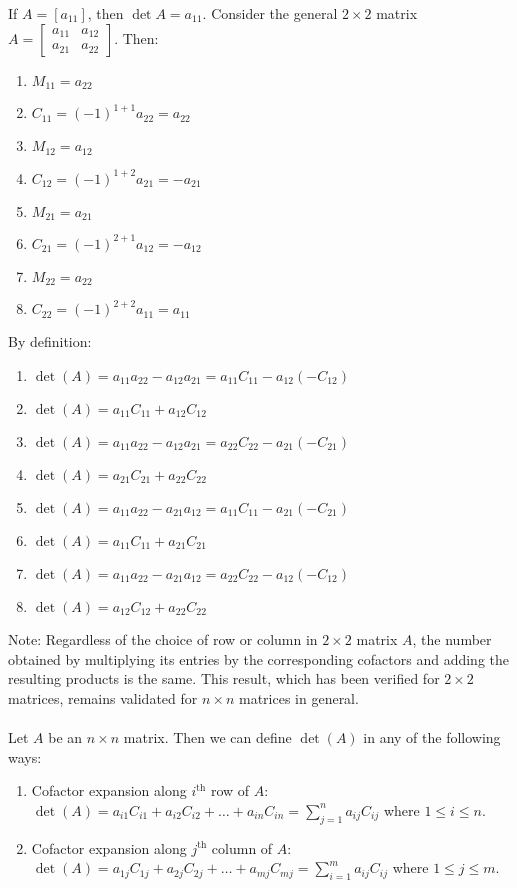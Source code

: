 \documentclass[12pt]{article}
\begin{document}
  If $A = [a_{11}]$, then $\det {A} = a_{11} $. \newline
  Consider the general $ 2 \times 2$ matrix $A = \begin{bmatrix} a_{11} & a_{12} \\ a_{21} & a_{22} \end{bmatrix} $. \newline Then: \begin{enumerate} 
  \item $ M_{11} = a_{22} $ \item $ C_{11} = (-1)^{1 + 1}a_{22} = a_{22} $
  \item $ M_{12} = a_{12} $ \item $ C_{12} = (-1)^{1 + 2}a_{21} = -a_{21} $
  \item $ M_{21} = a_{21} $ \item $ C_{21} = (-1)^{2 + 1}a_{12} = -a_{12} $
  \item $ M_{22} = a_{22} $ \item $ C_{22} = (-1)^{2 + 2}a_{11} = a_{11} $ \end{enumerate}  
  By definition: \begin{enumerate} 
  \item $ \det(A) = a_{11}a_{22} - a_{12}a_{21} = a_{11}C_{11} - a_{12}(-C_{12}) $
  \item $ \det(A) = a_{11}C_{11} + a_{12}C_{12} $
  \item $ \det(A) = a_{11}a_{22} - a_{12}a_{21} = a_{22}C_{22} - a_{21}(-C_{21}) $
  \item $ \det(A) = a_{21}C_{21} + a_{22}C_{22} $
  \item $ \det(A) = a_{11}a_{22} - a_{21}a_{12} = a_{11}C_{11} - a_{21}(-C_{21}) $
  \item $ \det(A) = a_{11}C_{11} + a_{21}C_{21} $
  \item $ \det(A) = a_{11}a_{22} - a_{21}a_{12} = a_{22}C_{22} - a_{12}(-C_{12}) $
  \item $ \det(A) = a_{12}C_{12} + a_{22}C_{22} $ \end{enumerate} 
  Note: Regardless of the choice of row or column in $2 \times 2$ matrix $A$, the number obtained by multiplying its entries by the corresponding cofactors and adding the resulting products is the same. This result, which has been verified for $2 \times 2$ matrices, remains validated for $n \times n$ matrices in general. \\~\\
  Let $A$ be an $n \times n$ matrix. Then we can define $\det(A)$ in any of the following ways: \begin{enumerate} 
  \item Cofactor expansion along $i^\text{th}$ row of $A$: $\det(A) = a_{i1}C_{i1} + a_{i2}C_{i2} + \dots + a_{in}C_{in} = \sum\limits_{j = 1}^{n} a_{ij}C_{ij} $ where $ 1 \leq i \leq n$. 
  \item Cofactor expansion along $j^\text{th}$ column of $A$: $\det(A) = a_{1j}C_{1j} + a_{2j}C_{2j} + \dots + a_{mj}C_{mj} = \sum\limits_{i = 1}^{m} a_{ij}C_{ij} $ where $ 1 \leq j \leq m$. \end{enumerate} 
\end{document}
